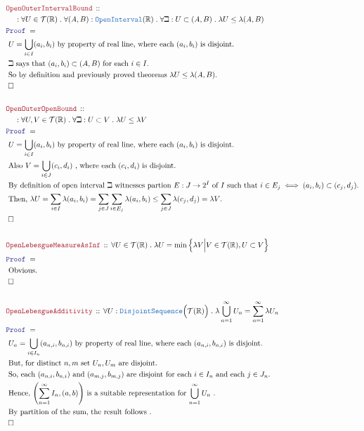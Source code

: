 \documentclass[12pt]{scrartcl}
\newcommand{\TYPE}[1]{\textcolor{NavyBlue}{\mathtt{#1}}}
\newcommand{\LOGIC}[1]{\textcolor{Blue}{\mathtt{#1}}}
\newcommand{\THM}[1]{\textcolor{Maroon}{\mathtt{#1}}}
\renewcommand{\.}{\; . \;}
\newcommand{\Theorem}[2]{& \THM{#1} \, :: \, #2 \\ & \Proof = \\ }
\newcommand{\NewLine}{\\ & \kern 1pc}
\newcommand{\Page}[1]{ \begin{align*} #1 \end{align*}   }
\newcommand{\Reals}{\mathbb{R} }
\newcommand{\QED}{\; \square}
\newcommand{\EndProof}{& \QED \\}
\newcommand{\Proof}{\LOGIC{Proof} \; }
\newcommand{\Explain}[1]{& \text{#1.} \\}
\newcommand{\T}{\mathcal{T}}
\newcommand{\OI}{\TYPE{OpenInterval}}
\begin{document}
\Page{
	\Theorem{OpenOuterIntervalBound}
	{
		\NewLine :		
		\forall U \in \T(\Reals) \.
		\forall (A,B) : \OI(\Reals) \.
		\forall \beth : U \subset (A,B) \.
		\lambda U \le \lambda (A,B)
	}
	\Explain{ $U = \bigcup_{i \in I} (a_i,b_i)$ by property of real line, where each $(a_i,b_i)$ is disjoint}
	\Explain{ $\beth$ says that $(a_i,b_i) \subset (A,B)$ for each $i \in I$}
	\Explain{ So by definition and previously proved theorems $\lambda U \le \lambda (A,B)$}
	\EndProof
	\\
	\Theorem{OpenOuterOpenBound}
	{
		\NewLine :		
		\forall U,V \in \T(\Reals) \.
		\forall \beth : U \subset V \.
		\lambda U \le \lambda V
	}
	\Explain{ $U = \bigcup_{i \in I} (a_i,b_i)$ by property of real line, where each $(a_i,b_i)$ is disjoint}
	\Explain{ Also $V = \bigcup_{i \in J} (c_i,d_i)$ , where each $(c_i,d_i)$ is disjoint}
	\Explain{ 
		By definition of open interval $\beth$ witnesses partion $E : J \to 2^I$ of $I$ 
		such that $i \in E_j \iff (a_i,b_i) \subset (c_j,d_j)$}
	\Explain{ Then, 
		$
			\lambda U = 
			\sum_{i \in I} \lambda(a_i,b_i) =
			\sum_{j \in J} \sum_{i \in E_j} \lambda(a_i,b_i) \le 
			\sum_{j \in J} \lambda(c_j, d_j) = 
			\lambda V
		$}
	\EndProof
	\\
	\Theorem{OpenLebesgueMeasureAsInf}
	{
		\forall U \in \T(\Reals) \.
		\lambda U = \min \Big\{ \lambda V \Big| V \in \T(\Reals),  U \subset V \Big\} 
	}
	\Explain{ Obvious}
	\EndProof
	\\
	\Theorem{OpenLebesgueAdditivity}
	{
		\forall U : \TYPE{DisjointSequence}\Big( \T(\Reals) \Big) \.
		\lambda \bigcup^\infty_{n=1} U_n = \sum^\infty_{n=1} \lambda U_n
	}
	\Explain{
		$U_n = \bigcup_{i \in I_n} (a_{n,i},b_{n,i})$ 
		by property of real line, where each $(a_{n,i},b_{n,i})$ is disjoint}
	\Explain{ 
		But, for distinct $n,m$ set  $U_n,U_m$ are disjoint} 
	\Explain{
		So, each $(a_{n,i},b_{n,i})$ and $(a_{m,j},b_{m,j})$ are disjoint
		for each $i \in I_n$ and each $j \in J_n$}  
	\Explain{
		Hence, $\left( \sum^\infty_{n=1} I_n, (a,b) \right)$ is a suitable representation for
		$\bigcup^\infty_{n=1} U_n$ 
	}
	\Explain{
		By partition of the sum, the result follows
	}
	\EndProof
}
\end{document}
